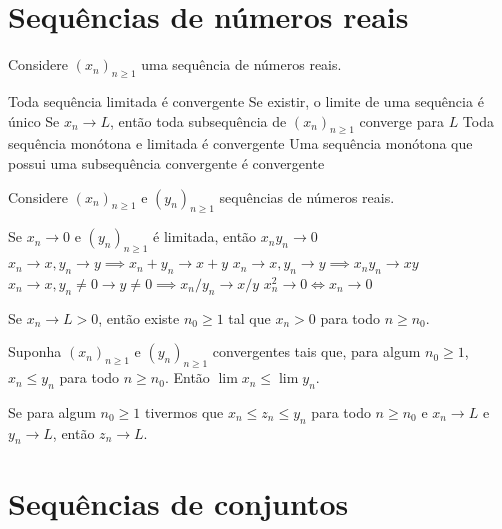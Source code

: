 \section{Sequências de números reais}

\begin{theorem}
	Considere $(x_n)_{n\geq1}$ uma sequência de números reais.
	\begin{outline}[enumerate]
		\1 Toda sequência limitada é convergente
		\1 Se existir, o limite de uma sequência é único
		\1 Se $x_n \to L$, então toda subsequência de $(x_n)_{n\geq1}$ converge para $L$
		\1 Toda sequência monótona e limitada é convergente
		\1 Uma sequência monótona que possui uma subsequência convergente é convergente
	\end{outline}
\end{theorem}

\begin{theorem}
	Considere $(x_n)_{n\geq1}$ e $(y_n)_{n\geq1}$ sequências de números reais.
	\begin{outline}[enumerate]
		\1 Se $x_n \to 0$ e $(y_n)_{n\geq1}$ é limitada, então $x_n y_n \to 0$
		\1 \( x_n \to x, y_n \to y \implies x_n+y_n \to x+y \)
		\1 \( x_n \to x, y_n \to y \implies x_n y_n \to xy \)
		\1 \( x_n \to x, y_n \neq 0 \to y\neq0 \implies x_n/y_n \to x/y \)
		\1 \(x_n^2 \to 0 \iff x_n \to0\)
	\end{outline}
\end{theorem}

\begin{theorem}
	Se $x_n\to L > 0$, então existe $n_0\geq1$ tal que $x_n>0$ para todo $n\geq n_0$.
\end{theorem}

\begin{corollary}
	Suponha $(x_n)_{n\geq1}$ e $(y_n)_{n\geq1}$ convergentes tais que, para algum $n_0 \geq 1$, $x_n \leq y_n$ para todo $n \geq n_0$. Então $\lim x_n \leq \lim y_n$.
\end{corollary}

\begin{theorem}[Sanduíche]
	Se para algum $n_0\geq1$ tivermos que $x_n\leq z_n \leq y_n$ para todo $n\geq n_0$ e $x_n \to L$ e $y_n\to L$, então $z_n \to L$.
\end{theorem}



\section{Sequências de conjuntos}

